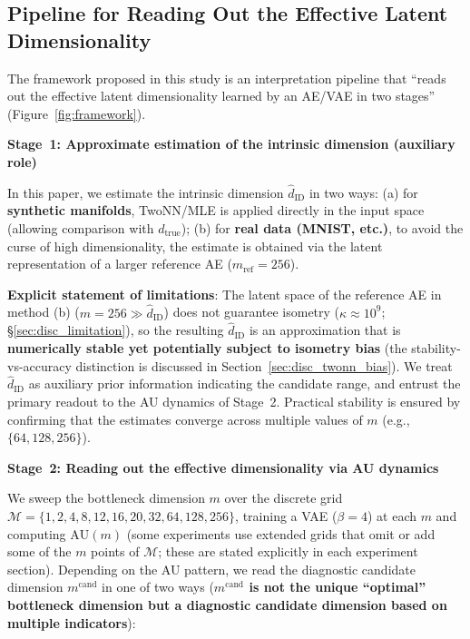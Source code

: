 \documentclass[make,article,submit,pdftex,moreauthors]{Definitions/mdpi}
\newcommand{\dzopt}{m^{\mathrm{cand}}}
\newcommand{\dtrue}{d_{\mathrm{true}}}
\newcommand{\kap}{\kappa}
\begin{document}
\subsection{Pipeline for Reading Out the Effective Latent Dimensionality}\label{sec:framework_pipeline}

The framework proposed in this study is an interpretation pipeline that
``reads out the effective latent dimensionality learned by an AE/VAE in two
stages'' (Figure~\ref{fig:framework}).

\textbf{Stage~1: Approximate estimation of the intrinsic dimension (auxiliary role)}

In this paper, we estimate the intrinsic dimension $\hat{d}_\mathrm{ID}$ in two ways:
(a) for \textbf{synthetic manifolds}, TwoNN/MLE is applied directly in the input
space (allowing comparison with $\dtrue$);
(b) for \textbf{real data (MNIST, etc.)}, to avoid the curse of high
dimensionality, the estimate is obtained via the latent representation of a
larger reference AE ($m_{\mathrm{ref}} = 256$).

\textbf{Explicit statement of limitations}: The latent space of the reference AE
in method (b) ($m = 256 \gg \hat{d}_\mathrm{ID}$) does not guarantee isometry
($\kap \approx 10^9$; §\ref{sec:disc_limitation}),
so the resulting $\hat{d}_\mathrm{ID}$ is an approximation that is
\textbf{numerically stable yet potentially subject to isometry bias}
(the stability-vs-accuracy distinction is discussed in
Section~\ref{sec:disc_twonn_bias}).
We treat $\hat{d}_\mathrm{ID}$ as auxiliary prior information indicating the
candidate range, and entrust the primary readout to the AU dynamics of Stage~2.
Practical stability is ensured by confirming that the estimates converge across
multiple values of $m$ (e.g., $\{64, 128, 256\}$).

\textbf{Stage~2: Reading out the effective dimensionality via AU dynamics}

We sweep the bottleneck dimension $m$ over the discrete grid
$\mathcal{M} = \{1, 2, 4, 8, 12,\allowbreak 16, 20, 32,\allowbreak 64, 128, 256\}$,
training a VAE ($\beta = 4$) at each $m$ and computing $\mathrm{AU}(m)$
(some experiments use extended grids that omit or add some of the $m$ points of
$\mathcal{M}$; these are stated explicitly in each experiment section).
Depending on the AU pattern, we read the diagnostic candidate dimension
$\dzopt$ in one of two ways
(\textbf{$\dzopt$ is not the unique ``optimal'' bottleneck dimension but a
diagnostic candidate dimension based on multiple indicators}):
\end{document}
